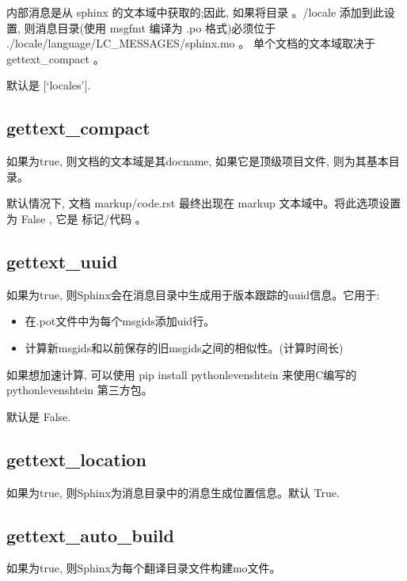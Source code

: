 \documentclass[a4paper,10pt,english]{sphinxmanual}
\begin{document}
\sphinxAtStartPar
内部消息是从 sphinx 的文本域中获取的;因此, 如果将目录 。/locale 添加到此设置, 则消息目录(使用 msgfmt 编译为 .po 格式)必须位于 ./locale/language/LC\_MESSAGES/sphinx.mo 。
单个文档的文本域取决于 gettext\_compact 。

\sphinxAtStartPar
默认是 {[}‘locales’{]}.


\subsection{gettext\_compact}
\label{\detokenize{sphinx_conf:gettext-compact}}
\sphinxAtStartPar
如果为true, 则文档的文本域是其docname, 如果它是顶级项目文件, 则为其基本目录。

\sphinxAtStartPar
默认情况下, 文档 markup/code.rst 最终出现在 markup 文本域中。将此选项设置为 False , 它是 标记/代码 。


\subsection{gettext\_uuid}
\label{\detokenize{sphinx_conf:gettext-uuid}}
\sphinxAtStartPar
如果为true, 则Sphinx会在消息目录中生成用于版本跟踪的uuid信息。它用于:
\begin{itemize}
\item {} 
\sphinxAtStartPar
在.pot文件中为每个msgids添加uid行。

\item {} 
\sphinxAtStartPar
计算新msgids和以前保存的旧msgids之间的相似性。(计算时间长)

\end{itemize}

\sphinxAtStartPar
如果想加速计算, 可以使用 pip install python\sphinxhyphen{}levenshtein 来使用C编写的 python\sphinxhyphen{}levenshtein 第三方包。

\sphinxAtStartPar
默认是 False.


\subsection{gettext\_location}
\label{\detokenize{sphinx_conf:gettext-location}}
\sphinxAtStartPar
如果为true, 则Sphinx为消息目录中的消息生成位置信息。默认 True.


\subsection{gettext\_auto\_build}
\label{\detokenize{sphinx_conf:gettext-auto-build}}
\sphinxAtStartPar
如果为true, 则Sphinx为每个翻译目录文件构建mo文件。
\end{document}
